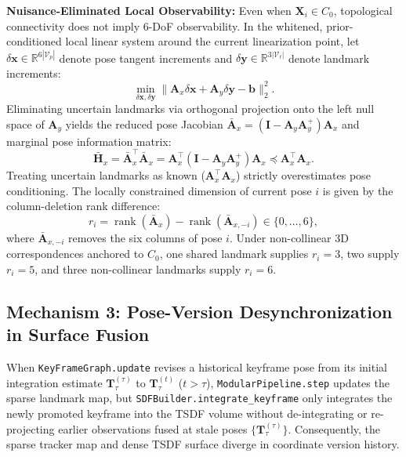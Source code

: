 \documentclass[10pt,journal]{IEEEtran}
\begin{document}
\textbf{Nuisance-Eliminated Local Observability:} Even when $\mathbf{X}_i\in C_0$, topological connectivity does not imply 6-DoF observability. In the whitened, prior-conditioned local linear system around the current linearization point, let $\delta\mathbf{x}\in\mathbb{R}^{6|\mathcal{V}_p|}$ denote pose tangent increments and $\delta\mathbf{y}\in\mathbb{R}^{3|\mathcal{V}_\ell|}$ denote landmark increments:
\begin{equation}
    \min_{\delta\mathbf{x},\delta\mathbf{y}}\|\mathbf{A}_x\delta\mathbf{x}+\mathbf{A}_y\delta\mathbf{y}-\mathbf{b}\|_2^2.
    \label{eq:joint_ls}
\end{equation}
Eliminating uncertain landmarks via orthogonal projection onto the left null space of $\mathbf{A}_y$ yields the reduced pose Jacobian $\bar{\mathbf{A}}_x=(\mathbf{I}-\mathbf{A}_y\mathbf{A}_y^+)\mathbf{A}_x$ and marginal pose information matrix:
\begin{equation}
    \bar{\mathbf{H}}_x=\bar{\mathbf{A}}_x^\top\bar{\mathbf{A}}_x=\mathbf{A}_x^\top(\mathbf{I}-\mathbf{A}_y\mathbf{A}_y^+)\mathbf{A}_x\preceq\mathbf{A}_x^\top\mathbf{A}_x.
    \label{eq:schur_info}
\end{equation}
Treating uncertain landmarks as known ($\mathbf{A}_x^\top\mathbf{A}_x$) strictly overestimates pose conditioning. The locally constrained dimension of current pose $i$ is given by the column-deletion rank difference:
\begin{equation}
    r_i=\operatorname{rank}(\bar{\mathbf{A}}_x)-\operatorname{rank}(\bar{\mathbf{A}}_{x,-i})\in\{0,\dots,6\},
    \label{eq:rank_diff}
\end{equation}
where $\bar{\mathbf{A}}_{x,-i}$ removes the six columns of pose $i$. Under non-collinear 3D correspondences anchored to $C_0$, one shared landmark supplies $r_i=3$, two supply $r_i=5$, and three non-collinear landmarks supply $r_i=6$.

\subsection{Mechanism 3: Pose-Version Desynchronization in Surface Fusion}
When \texttt{KeyFrameGraph.update} revises a historical keyframe pose from its initial integration estimate $\mathbf{T}_\tau^{(\tau)}$ to $\mathbf{T}_\tau^{(t)}$ ($t>\tau$), \texttt{ModularPipeline.step} updates the sparse landmark map, but \texttt{SDFBuilder.integrate\_keyframe} only integrates the newly promoted keyframe into the TSDF volume without de-integrating or re-projecting earlier observations fused at stale poses $\{\mathbf{T}_\tau^{(\tau)}\}$. Consequently, the sparse tracker map and dense TSDF surface diverge in coordinate version history.
\end{document}
